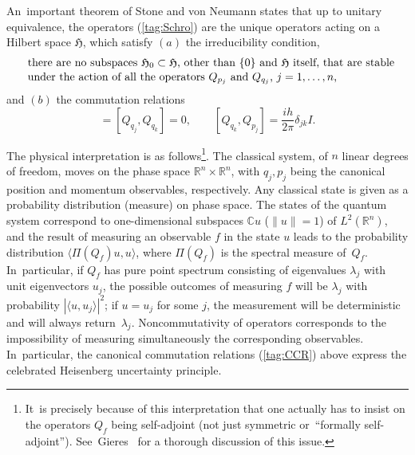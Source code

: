 \documentclass[12pt]{amsart}
\numberwithin{equation}{section}
\theoremstyle{remark}
\newcommand\spr[2]{\langle #1,#2\rangle}
\newcommand\HH{\mathfrak H}
\newcommand\RR{\mathbb R}
\newcommand{\CC}{\C}
\newcommand{\C}{\mathbb C}
\begin{document}
An~important theorem of Stone and von Neumann  \cite{bib:vNeu}
states that up to unitary
equivalence, the operators (\ref{tag:Schro}) are the unique operators acting on
a Hilbert space $\HH$, which satisfy $(a)$ the irreducibility condition,
\begin{equation}  \begin{aligned}
& \text{there are no subspaces $\HH_0\subset\HH$, other than $\{0\}$ and $\HH$
itself, that are stable} \\
\noalign{\vskip-2pt}
& \text{under the action  of all the operators $Q_{p_j}$ and $Q_{q_j}$,
$j=1,\dots,n$,} \end{aligned}  \label{tag:IRE}  \end{equation}
and $(b)$ the commutation relations
\begin{equation}  [Q_{p_j},Q_{p_k}] = [Q_{q_j},Q_{q_k}] =0, \qquad
[Q_{q_k}, Q_{p_j}] = \frac{ih}{2\pi} \delta_{jk} I . \label{tag:CCR}
\end{equation}


The physical interpretation is as follows\footnote{It~is
precisely because of this interpretation that one actually has to
insist on the operators $Q_f$ being self-adjoint (not just
symmetric or~``formally self-adjoint'').
See~Gieres~\cite{bib:Gieres} for a thorough discussion of this
issue.}. The classical system, of $n$ linear degrees of freedom,
moves on the phase space $\RR^n \times \RR^n$, with $q_j, p_j$ being
the canonical position and momentum observables, respectively. Any classical
state is given as a probability distribution (measure) on phase space.
The states of the quantum system correspond to
one-dimensional subspaces $\CC u$ ($\|u\|=1$) of $L^2(\RR^n)$, and
the result of measuring an observable $f$ in the state $u$ leads to the
probability distribution $\spr{\Pi(Q_f) u}u$, where
$\Pi(Q_f)$ is the spectral measure of~$Q_f$. In~particular, if
$Q_f$ has pure point spectrum consisting of eigenvalues
$\lambda_j$ with unit eigenvectors $u_j$, the possible outcomes of
measuring $f$ will be $\lambda_j$ with probability $|\spr
u{u_j}|^2$; if $u=u_j$ for some $j$, the measurement will be
deterministic and will always return~$\lambda_j$. Noncommutativity
of operators corresponds to the impossibility of measuring
simultaneously the corresponding observables. In~particular, the
canonical commutation relations (\ref{tag:CCR}) above express the
celebrated Heisenberg uncertainty principle.
\end{document}
